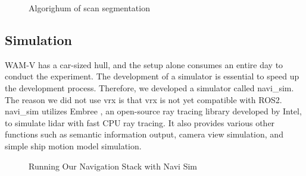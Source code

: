 \documentclass[lettersize,journal]{IEEEtran}
\begin{document}
\begin{figure}[H]
    \begin{center}
  \end{center}
  \caption{Algorighum of scan segmentation}
  \label{fig:scan_segmentation}
\end{figure}

\subsection{Simulation}

WAM-V has a car-sized hull, and the setup alone consumes an entire day to conduct the experiment.
The development of a simulator is essential to speed up the development process.
Therefore, we developed a simulator called navi\_sim.
The reason we did not use vrx is that vrx is not yet compatible with ROS2.
navi\_sim utilizes Embree \cite{embree}, an open-source ray tracing library developed by Intel, to simulate lidar with fast CPU ray tracing.
It also provides various other functions such as semantic information output, camera view simulation, and simple ship motion model simulation.

\begin{figure}[H]
    \begin{center}
    \end{center}
    \caption{Running Our Navigation Stack with Navi Sim}
    \label{fig:navi_sim}
\end{figure}
\end{document}
